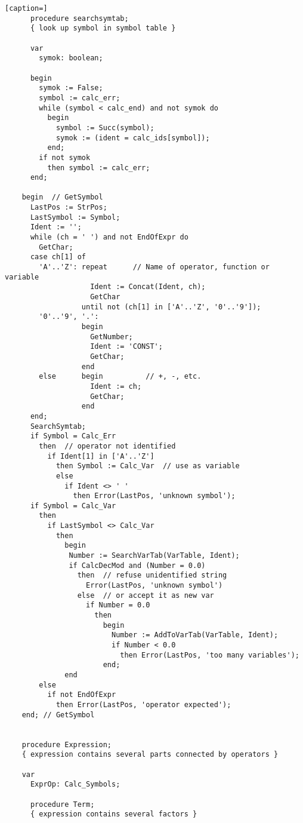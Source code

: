 \begin{refsection}
\begin{lstlisting}[caption=]
      procedure searchsymtab;
      { look up symbol in symbol table }

      var
        symok: boolean;

      begin
        symok := False;
        symbol := calc_err;
        while (symbol < calc_end) and not symok do
          begin
            symbol := Succ(symbol);
            symok := (ident = calc_ids[symbol]);
          end;
        if not symok
          then symbol := calc_err;
      end;

    begin  // GetSymbol
      LastPos := StrPos;
      LastSymbol := Symbol;
      Ident := '';
      while (ch = ' ') and not EndOfExpr do
        GetChar;
      case ch[1] of
        'A'..'Z': repeat      // Name of operator, function or variable
                    Ident := Concat(Ident, ch);
                    GetChar
                  until not (ch[1] in ['A'..'Z', '0'..'9']);
        '0'..'9', '.':
                  begin
                    GetNumber;
                    Ident := 'CONST';
                    GetChar;
                  end
        else      begin          // +, -, etc.
                    Ident := ch;
                    GetChar;
                  end
      end;
      SearchSymtab;
      if Symbol = Calc_Err
        then  // operator not identified
          if Ident[1] in ['A'..'Z']
            then Symbol := Calc_Var  // use as variable
            else
              if Ident <> ' '
                then Error(LastPos, 'unknown symbol');
      if Symbol = Calc_Var
        then
          if LastSymbol <> Calc_Var
            then
              begin
               Number := SearchVarTab(VarTable, Ident);
               if CalcDecMod and (Number = 0.0)
                 then  // refuse unidentified string
                   Error(LastPos, 'unknown symbol')
                 else  // or accept it as new var
                   if Number = 0.0
                     then
                       begin
                         Number := AddToVarTab(VarTable, Ident);
                         if Number < 0.0
                           then Error(LastPos, 'too many variables');
                       end;
              end
        else
          if not EndOfExpr
            then Error(LastPos, 'operator expected');
    end; // GetSymbol


    procedure Expression;
    { expression contains several parts connected by operators }

    var
      ExprOp: Calc_Symbols;

      procedure Term;
      { expression contains several factors }


\end{lstlisting}
\end{refsection}
